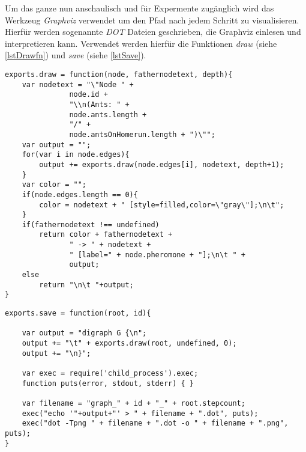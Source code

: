 Um das ganze nun anschaulisch und für Expermente zugänglich wird das
Werkzeug \emph{Graphviz} verwendet um den Pfad nach jedem Schritt zu
visualisieren. Hierfür werden sogenannte \emph{DOT} Dateien
geschrieben, die Graphviz einlesen und interpretieren
kann. Verwendet werden hierfür die Funktionen \emph{draw} (siehe
\ref{lstDrawfn}) und \emph{save} (siehe \ref{lstSave}).

  \begin{lstlisting}[captionpos=b, caption=Draw Funktion, label=lstDrawfn]
exports.draw = function(node, fathernodetext, depth){
    var nodetext = "\"Node " +
               node.id +
               "\\n(Ants: " +
               node.ants.length +
               "/" +
               node.antsOnHomerun.length + ")\"";
    var output = "";
    for(var i in node.edges){
        output += exports.draw(node.edges[i], nodetext, depth+1);
    }
    var color = "";
    if(node.edges.length == 0){
        color = nodetext + " [style=filled,color=\"gray\"];\n\t";
    }
    if(fathernodetext !== undefined)
        return color + fathernodetext +
               " -> " + nodetext +
               " [label=" + node.pheromone + "];\n\t " +
               output;
    else
        return "\n\t "+output;
}
  \end{lstlisting}

  \begin{lstlisting}[captionpos=b, caption=Mehr Text, label=lstSave]
exports.save = function(root, id){

    var output = "digraph G {\n";
    output += "\t" + exports.draw(root, undefined, 0);
    output += "\n}";

    var exec = require('child_process').exec;
    function puts(error, stdout, stderr) { }

    var filename = "graph_" + id + "_" + root.stepcount;
    exec("echo '"+output+"' > " + filename + ".dot", puts);
    exec("dot -Tpng " + filename + ".dot -o " + filename + ".png", puts);
}
  \end{lstlisting}

